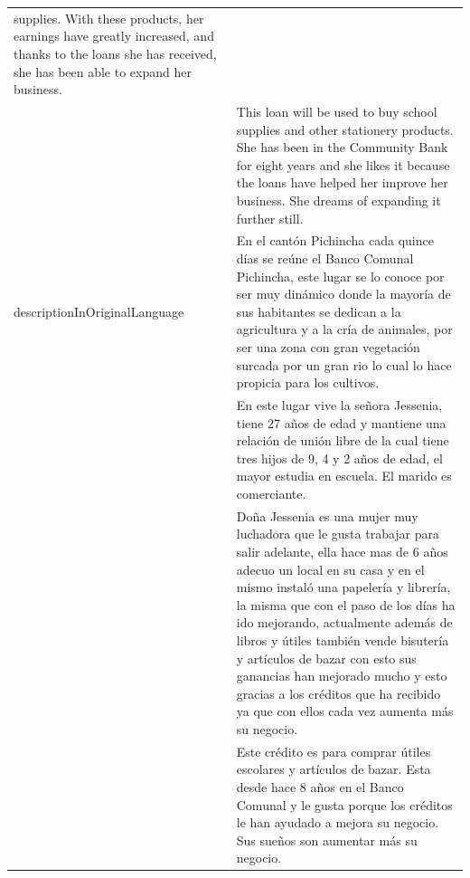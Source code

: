 \begin{longtable}{|p{}|p{}|}
    supplies. With these products, her earnings have greatly increased, and
    thanks to the loans she has received, she has been able to expand her
    business.                                                                                                  \\
                                         & This loan will be used to buy school supplies and other stationery
    products. She has been in the Community Bank for eight years and she
    likes it because the loans have helped her improve her business. She
    dreams of expanding it further still.                                                                      \\
    descriptionInOriginalLanguage        & En el cantón Pichincha cada quince días
    se reúne el Banco Comunal Pichincha, este lugar se lo conoce por ser muy
    dinámico donde la mayoría de sus habitantes se dedican a la agricultura
    y a la cría de animales, por ser una zona con gran vegetación surcada
    por un gran rio lo cual lo hace propicia para los cultivos.                                                \\
                                         & En este lugar vive la señora Jessenia, tiene 27 años de edad y
    mantiene una relación de unión libre de la cual tiene tres hijos de 9, 4
    y 2 años de edad, el mayor estudia en escuela. El marido es
    comerciante.                                                                                               \\
                                         & Doña Jessenia es una mujer muy luchadora que le gusta trabajar para
    salir adelante, ella hace mas de 6 años adecuo un local en su casa y en
    el mismo instaló una papelería y librería, la misma que con el paso de
    los días ha ido mejorando, actualmente además de libros y útiles también
    vende bisutería y artículos de bazar con esto sus ganancias han mejorado
    mucho y esto gracias a los créditos que ha recibido ya que con ellos
    cada vez aumenta más su negocio.                                                                           \\
                                         & Este crédito es para comprar útiles escolares y artículos de bazar.
    Esta desde hace 8 años en el Banco Comunal y le gusta porque los
    créditos le han ayudado a mejora su negocio. Sus sueños son aumentar más
    su negocio.                                                                                                \\
\end{longtable}

